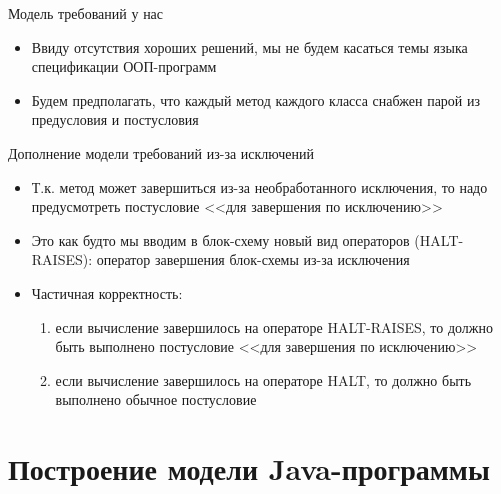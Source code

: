 \documentclass[hyperref={unicode=true}]{beamer}
\begin{document}
    \begin{frame}{Модель требований у нас}
    \begin{itemize}
    \item
    Ввиду отсутствия хороших решений, мы не будем
    касаться темы языка спецификации ООП-программ
    \item
    Будем предполагать, что каждый метод каждого
    класса снабжен парой из предусловия и постусловия
    \end{itemize}
    \end{frame}

    \begin{frame}{Дополнение модели требований из-за исключений}
    \begin{itemize}
    \item
    Т.к. метод может завершиться из-за необработанного
    исключения, то надо предусмотреть постусловие
    <<для завершения по исключению>>
    \item
    Это как будто мы вводим в блок-схему новый вид операторов
    (HALT-RAISES): оператор завершения блок-схемы из-за исключения
    \item
    Частичная корректность:
        \begin{enumerate}
        \item
        если вычисление завершилось на
        операторе HALT-RAISES, то должно быть выполнено постусловие
        <<для завершения по исключению>>
        \item
        если вычисление завершилось на операторе HALT,
        то должно быть выполнено обычное постусловие
        \end{enumerate}
    \end{itemize}
    \end{frame}

    \section{Построение модели Java-программы}
\end{document}
